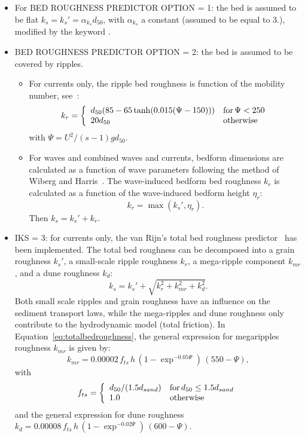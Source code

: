 \begin{itemize}
\item For {\ttfamily BED ROUGHNESS PREDICTOR OPTION = 1}: the bed is assumed to be flat $k_s = k_s'= \alpha_{k_s} d_{50}$, with $\alpha_{k_s}$ a constant (assumed to be equal to $3.$), modified by the keyword . 
\item {\ttfamily BED ROUGHNESS PREDICTOR OPTION = 2}: the bed is assumed to be covered by ripples.
  \begin{itemize}
    \item For currents only, the ripple bed roughness is function of the mobility number, see~\cite{vanRijn07}:
\begin{equation*}
k_r =\left\{\begin{array}{ll}
d_{50}(85-65\tanh(0.015(\Psi-150))) & \text{for\,} \Psi<250\\
20 d_{50} & \text{otherwise} 
\end{array}
\right.
\end{equation*}
with $\Psi =U^2/(s-1)gd_{50}$.

    \item For waves and combined waves and currents, bedform dimensions are calculated
as a function of wave parameters following the method of Wiberg and Harris~\cite{WibergHarris}. 
The wave-induced bedform bed roughness $k_r$ is calculated as a function of the wave-induced bedform 
height $\eta_r$: 
\begin{equation}
k_r = \max(k_s', \eta_r).
\end{equation}
Then $k_s=k_s'+k_r$.
  \end{itemize}
 
\item {\ttfamily IKS = 3}: for currents only, the van Rijn's total bed roughness predictor~\cite{vanRijn07, Huybrechts} has been implemented. 
The total bed roughness can be decomposed into a grain
roughness $k_s'$, a small-scale ripple roughness $k_r$, a mega-ripple 
component $k_{mr}$, and a dune roughness $k_d$:
\begin{equation}\label{eq:totalbedroughness}
k_s = k_s' + \sqrt{k_r^2 + k_{mr}^2 + k_d^2}. 
\end{equation}
Both small scale ripples and grain roughness have an influence on the
sediment transport laws, while the mega-ripples and dune roughness only
contribute to the hydrodynamic model (total friction). In Equation~\ref{eq:totalbedroughness}, the general expression for megaripples roughness $k_{mr}$ is given by:
\begin{equation}
k_{mr} = 0.00002\,f_{ts}\,h\,(1-\exp^{-0.05\Psi})\,(550-\Psi),
\end{equation}
with
\begin{equation*}
f_{ts} =\left\{\begin{array}{ll}
d_{50}/(1.5d_{sand}) & \text{for\,} d_{50}\leq 1.5d_{sand}\\
1.0 & \text{otherwise} 
\end{array}
\right.
\end{equation*}
and the general expression for dune roughness $k_d=0.00008\,f_{ts}\,h\,(1-\exp^{-0.02\Psi})\,(600-\Psi)$.


\end{itemize}

